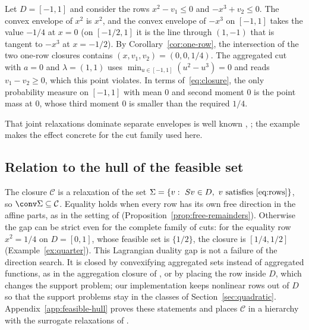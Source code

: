 \begin{example}\label{ex:two-rows}
Let $D=[-1,1]$ and consider the rows $x^2-v_1\le0$ and $-x^3+v_2\le0$. The
convex envelope of $x^2$ is $x^2$, and the convex envelope of $-x^3$ on
$[-1,1]$ takes the value $-1/4$ at $x=0$ (on $[-1/2,1]$ it is the line through
$(1,-1)$ that is tangent to $-x^3$ at $x=-1/2$). By
Corollary~\ref{cor:one-row}, the intersection of the two one-row closures
contains $(x,v_1,v_2)=(0,0,1/4)$. The aggregated cut with $a=0$ and
$\lambda=(1,1)$ uses $\min_{u\in[-1,1]}(u^2-u^3)=0$ and reads $v_1-v_2\ge0$,
which this point violates. In terms of~\eqref{eq:closure}, the only
probability measure on $[-1,1]$ with mean $0$ and second moment $0$ is the
point mass at $0$, whose third moment $0$ is smaller than the required $1/4$.
\end{example}

That joint relaxations dominate separate envelopes is well known
\citep[Lemma~3.4]{Nowak2005}, \citep{Tawarmalani2010,LiersEtAl2021}; the
example makes the effect concrete for the cut family used here.

\subsection{Relation to the hull of the feasible set}\label{sec:feasible-hull}

The closure $\mathcal C$ is a relaxation of the set
$\Sigma=\{v:\ Sv\in D,\ v\text{ satisfies~\eqref{eq:rows}}\}$, so
$\conv\Sigma\subseteq\mathcal C$. Equality holds when every row has its own free
direction in the affine parts, as in the setting of \citet{LiersEtAl2021}
(Proposition~\ref{prop:free-remainders}). Otherwise the gap can be strict even
for the complete family of cuts: for the equality row $x^2=1/4$ on $D=[0,1]$,
whose feasible set is $\{1/2\}$, the closure is $[1/4,1/2]$
(Example~\ref{ex:quarter}). This Lagrangian duality gap
\citep{Geoffrion1974,Nowak2005} is not a failure of the direction search. It is
closed by convexifying aggregated sets instead of aggregated functions, as in
the aggregation closure of \citet{DeyMunozSerrano2022}, or by placing the row
inside $D$, which changes the support problem; our implementation keeps
nonlinear rows out of $D$ so that the support problems stay in the classes of
Section~\ref{sec:quadratic}. Appendix~\ref{app:feasible-hull} proves these
statements and places $\mathcal C$ in a hierarchy with the surrogate
relaxations of \citet{MullerEtAl2022}.
